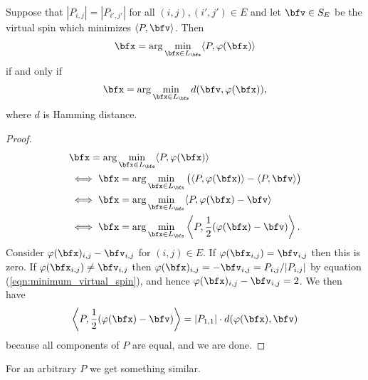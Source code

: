 \documentclass[raggedright, nofonts, notitlepage, openany, debug]{tufte-book}
\begin{document}
\begin{prop}\label{prop:hamming_distance_to_minimum_virtual_spin}
  Suppose that $|P_{i,j}| = |P_{i',j'}|$ for all $(i,j), (i',j') \in E$ and let $\bfv \in S_E$ be the virtual spin which minimizes $\langle P, \bfv \rangle$. Then
  \begin{align*}
    \bfx = \arg\min_{\bfx \in L_\bfs} \langle P, \varphi(\bfx) \rangle
  \end{align*}
  if and only if
  \begin{align*}
    \bfx = \arg\min_{\bfx \in L_{\bfs}} d(\bfv, \varphi(\bfx)),
  \end{align*}
  where $d$ is Hamming distance.
\end{prop}
\begin{proof}
  \begin{align*} 
    &\bfx = \arg\min_{\bfx \in L_\bfs} \langle P, \varphi(\bfx) \rangle \\
    &\iff \bfx = \arg\min_{\bfx \in L_\bfs} \big(\langle P, \varphi(\bfx) \rangle - \langle P, \bfv \rangle\big)\\
    &\iff \bfx = \arg\min_{\bfx \in L_\bfs} \langle P, \varphi(\bfx) - \bfv \rangle \\
    &\iff \bfx = \arg\min_{\bfx \in L_\bfs} \left\langle P, \frac{1}{2}(\varphi(\bfx) - \bfv) \right\rangle.
  \end{align*}
  Consider $\varphi(\bfx)_{i,j} - \bfv_{i,j}$ for $(i,j) \in E$. If $\varphi(\bfx_{i,j}) = \bfv_{i,j}$ then this is zero. If $\varphi(\bfx_{i,j}) \neq \bfv_{i,j}$ then $\varphi(\bfx)_{i,j} = - \bfv_{i,j} = P_{i,j}/|P_{i,j}|$ by equation (\ref{eqn:minimum_virtual_spin}), and hence $\varphi(\bfx)_{i,j} - \bfv_{i,j} = 2$. We then have
  \begin{align*}
    \left\langle P, \frac{1}{2}(\varphi(\bfx) - \bfv) \right\rangle = |P_{1,1}| \cdot d(\varphi(\bfx), \bfv)
  \end{align*}
  because all components of $P$ are equal, and we are done.
\end{proof}

For an arbitrary $P$ we get something similar.
\end{document}
